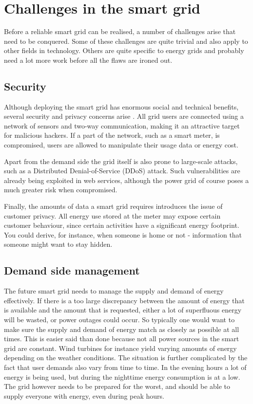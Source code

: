 \section{Challenges in the smart grid}
Before a reliable smart grid can be realised, a number of challenges arise that need to be conquered. Some of these challenges are quite trivial and also apply to other fields in technology. Others are quite specific to energy grids and probably need a lot more work before all the flaws are ironed out.
 
\subsection{Security}
Although deploying the smart grid has enormous social and technical benefits, several security and privacy concerns arise \cite{McDanielMcLaughlin2009a}. All grid users are connected using a network of sensors and two-way communication, making it an attractive target for malicious hackers. If a part of the network, such as a smart meter, is compromised, users are allowed to manipulate their usage data or energy cost. 

Apart from the demand side the grid itself is also prone to large-scale attacks, such as a Distributed Denial-of-Service (DDoS) attack. Such vulnerabilities are already being exploited in web services, although the power grid of course poses a much greater risk when compromised.

Finally, the amounts of data a smart grid requires introduces the issue of customer privacy. All energy use stored at the meter may expose certain customer behaviour, since certain activities have a significant energy footprint. You could derive, for instance, when someone is home or not - information that someone might want to stay hidden.


\subsection{Demand side management}

The future smart grid needs to manage the supply and demand of energy effectively. If there is a too large discrepancy between the amount of energy that is available and the amount that is requested, either a lot of superfluous energy will be wasted, or power outages could occur.
So typically one would want to make sure the supply and demand of energy match as closely as possible at all times. This is easier said than done because not all power sources in the smart grid are constant. Wind turbines for instance yield varying amounts of energy depending on the weather conditions. The situation is further complicated by the fact that user demands also vary from time to time. In the evening hours a lot of energy is being used, but during the nighttime energy consumption is at a low. The grid however needs to be prepared for the worst, and should be able to supply everyone with energy, even during peak hours.

